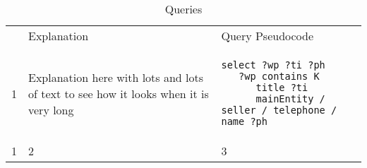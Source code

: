 

\begin{table} 
\begin{tabular}{ l l l }
 & Explanation & Query Pseudocode\\ 
%
1 & 
Explanation here with lots and lots of text to see how it looks when it is very long
& 
\begin{minipage}{3in}\begin{lstlisting}
select ?wp ?ti ?ph
   ?wp contains K
      title ?ti
      mainEntity / seller / telephone / name ?ph
\end{lstlisting}\end{minipage}\\
1&2&3 \\
%
\end{tabular} 
    \caption{Queries} 
\end{table}

